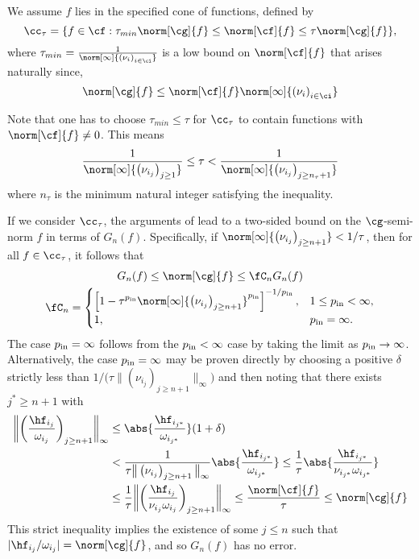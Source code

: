 \documentclass[final]{elsarticle}
\newcommand{\pin}{p_{\text{\rm{in}}}}
\theoremstyle{definition}
\theoremstyle{remark}
\begin{document}
We assume $f$ lies in the specified cone of functions, defined by
\begin{equation} \label{FGconedef}
\cc_{\tau} = \{f \in \cf : \tau_{min}\norm[\cg]{f} \le \norm[\cf]{f} \le \tau \norm[\cg]{f} \},
\end{equation}
where $\tau_{min}=\frac{1}{\norm[\infty]{\left(\nu_{i} \right)_{i\in\ci}}}$ is a low bound on $\norm[\cf]{f}$ that arises naturally since,
\begin{equation*}
\norm[\cg]{f}\le\norm[\cf]{f}\norm[\infty]{\left(\nu_{i} \right)_{i\in\ci}}
\end{equation*}

Note that one has to choose $\tau_{min}\le\tau$ for $\cc_{\tau}$ to contain functions with $\norm[\cf]{f}\neq 0$. This means
\begin{equation*}
\frac{1}{\norm[\infty]{\left(\nu_{i_j} \right)_{j\ge1}}}\le\tau<\frac{1}{\norm[\infty]{\left(\nu_{i_j} \right)_{j\ge n_\tau+1}}}
\end{equation*}
where $n_\tau$ is the minimum natural integer satisfying the inequality.

If we consider $\cc_\tau$, the arguments of \cite{HicEtal14b} lead to a two-sided bound on the $\cg$-semi-norm $f$ in terms of $G_n(f)$.  Specifically, if $\norm[\infty]{\left(\nu_{i_j} \right)_{j\ge n+1}} < 1/\tau$, then for all $f \in \cc_{\tau}$,  it follows that
\begin{gather}\label{ineqnormg}
G_n(f)  \le \norm[\cg]{f} \le \fC_n G_n(f)\\
\fC_n=\begin{cases}\displaystyle \left[1 - \tau^{\pin} \norm[\infty]{\left(\nu_{i_j} \right)_{j\ge n+1}}^{\pin}\right]^{-1/\pin}, & 1 \le \pin <  \infty, \\
1, & \pin =  \infty.
\end{cases}
\end{gather}
The case $\pin=\infty$ follows from the $\pin < \infty$ case by taking the limit as $\pin \to \infty$.  Alternatively, the case $\pin=\infty$ may be proven directly by choosing a positive $\delta$ strictly less than $1/\big(\tau \big\lVert\left(\nu_{i_j} \right)_{j\ge n+1}\big\rVert_{\infty}\big)$ and then noting that there exists $j^* \ge n+1$ with
\begin{align*}
\bigg\lVert\bigg(\frac{\hf_{i_j}}{\omega_{i_j}}\bigg)_{j\ge n+1}\bigg\rVert_{\infty}
& \le  \abs{\frac{\hf_{i_{j^*}}}{\omega_{i_{j^*}}}} (1+\delta) \\
& < \frac{1}{\tau \big\lVert\left(\nu_{i_j} \right)_{j\ge n+1}\big\rVert_{\infty}}  \abs{\frac{\hf_{i_{j^*}}}{\omega_{i_{j^*}}}}
\le \frac{1}{\tau } \abs{\frac{\hf_{i_{j^*}}}{\nu_{i_{j^*}} \omega_{i_{j^*}}}}\\
& \le \frac{1}{\tau }\bigg\lVert\bigg(\frac{\hf_{i_j}}{\nu_{i_j}\omega_{i_j}}\bigg)_{j\ge n+1}\bigg\rVert_{\infty} \le \frac{\norm[\cf]{f}}{\tau} \le \norm[\cg]{f}
\end{align*}
This strict inequality implies the existence of some $j \le n$ such that $\lvert\hf_{i_j}/\omega_{i_j} \rvert = \norm[\cg]{f}$, and so $G_n(f)$ has no error.
\end{document}
